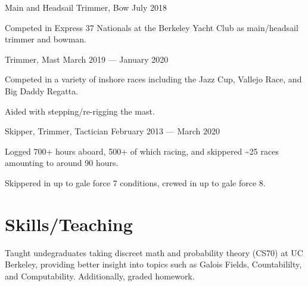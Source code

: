 \documentclass[10pt]{article}
\begin{document}
                {Main and Headsail Trimmer, Bow}
                {July 2018}
                \begin{accomplishments}
                  \item Competed in Express 37 Nationals at the Berkeley Yacht Club as main/headsail trimmer and bowman.
                \end{accomplishments}

                {Trimmer, Mast}
                {March 2019 --- January 2020}
                \begin{accomplishments}
                \item Competed in a variety of inshore races including the Jazz Cup, Vallejo Race, and Big Daddy Regatta.
                \item Aided with stepping/re-rigging the mast.
                \end{accomplishments}

								{Skipper, Trimmer, Tactician}
								{February 2013 --- March 2020}
                \begin{accomplishments}
                  \item Logged 700+ hours aboard, 500+ of which racing, and skippered \textasciitilde 25 races amounting to around 90 hours.
                  \item Skippered in up to gale force 7 conditions, crewed in up to gale force 8.
                 \end{accomplishments}

\section*{Skills/Teaching}
				{Taught undegraduates taking discreet math and probability theory (CS70) at UC Berkeley, providing 	better insight into topics such as Galois Fields, Countabililty, and Computability. Additionally, graded homework.}
\end{document}
